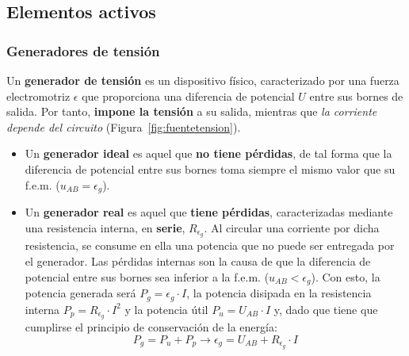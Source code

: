         \subsection{Elementos activos}\label{sec:elementos_activos}
	
	\subsubsection{Generadores de tensión}
	Un \textbf{generador de tensión} es un dispositivo físico,
        caracterizado por una fuerza electromotriz $\epsilon$ que
        proporciona una diferencia de potencial $U$ entre sus bornes
        de salida. Por tanto, \textbf{impone la tensión} a su salida,
        mientras que \emph{la corriente depende del circuito}
        (Figura~\ref{fig:fuentetension}).
	\begin{itemize}
        \item Un \textbf{generador ideal} es aquel que \textbf{no
            tiene pérdidas}, de tal forma que la diferencia de
          potencial entre sus bornes toma siempre el mismo valor que
          su f.e.m. ($u_{AB}=\epsilon_g$).
        \item Un \textbf{generador real} es aquel que \textbf{tiene
            pérdidas}, caracterizadas mediante una resistencia
          interna, en \textbf{serie}, $R_{\epsilon_g}$. Al circular
          una corriente por dicha resistencia, se consume en ella una
          potencia que no puede ser entregada por el generador. Las
          pérdidas internas son la causa de que la diferencia de
          potencial entre sus bornes sea inferior a la
          f.e.m. ($u_{AB}<\epsilon_g$). Con esto, la potencia generada
          será $P_g=\epsilon_g\cdot I$, la potencia disipada en la
          resistencia interna $P_p=R_{\epsilon_g}\cdot I^2$ y la
          potencia útil $P_u=U_{AB}\cdot I$ y, dado que tiene que
          cumplirse el principio de conservación de la energía:
          \begin{equation}
            P_g=P_u+P_p\rightarrow \boxed{ \epsilon_g=U_{AB}+ R_{\epsilon_g}\cdot I}
          \end{equation}
	\end{itemize}
